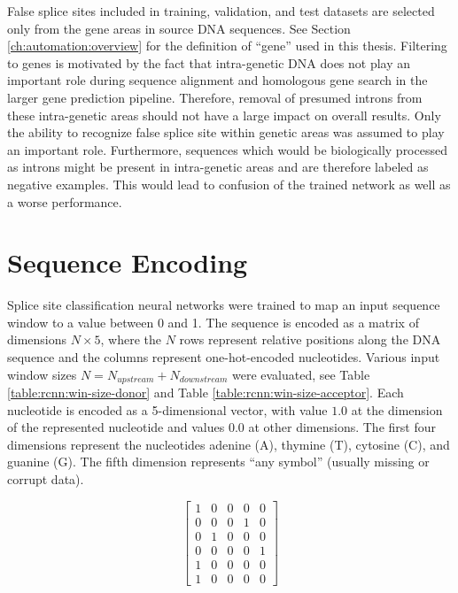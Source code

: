 False splice sites included in training, validation, and test datasets are
selected only from the gene areas in source DNA sequences. See Section
\ref{ch:automation:overview} for the definition of ``gene'' used in this
thesis. Filtering to genes is motivated by the fact that intra-genetic DNA does
not play an important role during sequence alignment and homologous gene search
in the larger gene prediction pipeline. Therefore, removal of presumed introns
from these intra-genetic areas should not have a large impact on overall
results. Only the ability to recognize false splice site within genetic areas
was assumed to play an important role. Furthermore, sequences which would be
biologically processed as introns might be present in intra-genetic areas and
are therefore labeled as negative examples. This would lead to confusion of the
trained network as well as a worse performance.

\section{\label{ch:rcnn:encoding}Sequence Encoding}

Splice site classification neural networks were trained to map an input
sequence window to a value between 0 and 1. The sequence is encoded as a matrix
of dimensions $N \times 5$, where the $N$ rows represent relative positions
along the DNA sequence and the columns represent one-hot-encoded nucleotides.
Various input window sizes $N = N_{upstream} + N_{downstream}$ were evaluated,
see Table \ref{table:rcnn:win-size-donor} and Table
\ref{table:rcnn:win-size-acceptor}. Each nucleotide is encoded as a
5-dimensional vector, with value $1.0$ at the dimension of the represented
nucleotide and values $0.0$ at other dimensions. The first four dimensions
represent the nucleotides adenine (A), thymine (T), cytosine (C), and guanine
(G). The fifth dimension represents ``any symbol'' (usually missing or corrupt
data).

\begin{equation}\label{ch:rcnn:ex-donor}
  \begin{bmatrix}
    1 & 0 & 0 & 0 & 0 \\  %
    0 & 0 & 0 & 1 & 0 \\  %
    0 & 1 & 0 & 0 & 0 \\  %
    0 & 0 & 0 & 0 & 1 \\ %
    1 & 0 & 0 & 0 & 0 \\ %
    1 & 0 & 0 & 0 & 0  %
  \end{bmatrix}
\end{equation}

